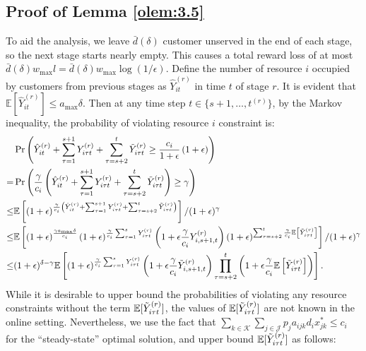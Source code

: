 \documentclass[letterpaper, 10 pt, conference]{ieeeconf}  %
\makeatletter
\renewenvironment{proof}[1][\relax]{\par
  \pushQED{\qed}%
  \normalfont \topsep6\p@\@plus6\p@\relax
  \trivlist
  \item[\hskip\labelsep\itshape
    \ifx#1\relax \proofname\else\proofname{} of #1\fi\@addpunct{.}]\ignorespaces
}{%
  \popQED\endtrivlist\@endpefalse
}
\newcommand{\JJJ}{\mathcal{J}}
\newcommand{\KKK}{\mathcal{K}}
\theoremstyle{plain}
\theoremstyle{definition}
\theoremstyle{remark}
\makeatother
\begin{document}
\subsection{Proof of Lemma \ref{olem:3.5}}
\begin{proof}
To aid the analysis, we leave $\bar{d}(\delta)$ customer unserved in the end of each stage, so the next stage starts nearly empty. This causes a total reward loss of at most $\bar{d}(\delta) w_{\max} l = \bar{d}(\delta) w_{\max} \log (1/\epsilon)$. Define the number of resource $i$ occupied by customers from previous stages as $\hat{Y}^{(r)}_{it}$ in time $t$ of stage $r$. It is evident that $\mathbb{E}[\hat{Y}^{(r)}_{it}] \leq a_{\max} \delta$. Then at any time step $t \in \{s+1,\ldots,t^{(r)}\}$, by the Markov inequality, the probability of violating resource $i$ constraint is:
\begin{align}
&\Pr\left(\hat{Y}^{(r)}_{it}+ \sum^{s+1}_{\tau=1} Y^{(r)}_{i \tau t}+ \sum^{t}_{\tau=s+2} \Tilde{Y}^{(r)}_{i \tau t} \geq \frac{c_i}{1+\epsilon}\left(1+\epsilon\right)\right) \nonumber \\
= & \Pr\left(\frac{\gamma}{c_i} \left(\hat{Y}^{(r)}_{it}+ \sum^{s+1}_{\tau=1} Y^{(r)}_{i \tau t}+ \sum^{t}_{\tau=s+2} \Tilde{Y}^{(r)}_{i \tau t}\right) \geq \gamma \right) \nonumber \\
\leq & \mathbb{E}\left[(1+\epsilon)^{\frac{\gamma}{c_i} \left(\hat{Y}^{(r)}_{it}+ \sum^{s+1}_{\tau=1} Y^{(r)}_{i \tau t}+ \sum^{t}_{\tau=s+2} \Tilde{Y}^{(r)}_{i \tau t}\right)} \right] / (1+\epsilon)^{\gamma} \nonumber \\
\leq & \mathbb{E}\left[(1+\epsilon)^{\frac{\gamma a_{\max} \delta}{c_i}} \left(1+\epsilon\right)^{\frac{\gamma}{c_i} \sum^{s}_{\tau=1} Y^{(r)}_{i \tau t}} \left(1+\epsilon \frac{\gamma}{c_i} Y^{(r)}_{i,s+1,t}\right)\left(1+\epsilon\right)^{\sum^{t}_{\tau=s+2} \frac{\gamma}{c_i}  \mathbb{E}\left[\Tilde{Y}^{(r)}_{i \tau t}\right]}\right] / (1+\epsilon)^{\gamma} \nonumber \\
\leq &  (1+\epsilon)^{\delta - \gamma} \mathbb{E}\left[\left(1+\epsilon\right)^{\frac{\gamma}{c_i} \sum^{s}_{\tau=1} Y^{(r)}_{i \tau t}} \left(1+\epsilon \frac{\gamma}{c_i} \Tilde{Y}^{(r)}_{i,s+1,t}\right) \prod^{t}_{\tau=s+2} \left(1+\epsilon \frac{\gamma}{c_i}  \mathbb{E}\left[\Tilde{Y}^{(r)}_{i \tau t}\right]\right)\right].  \label{oeq:res_vio}
\end{align}
While it is desirable to upper bound the probabilities of violating any resource constraints without the term $\mathbb{E}[\Tilde{Y}^{(r)}_{i \tau t}]$, the values of $\mathbb{E}[\Tilde{Y}^{(r)}_{i \tau t}]$ are not known in the online setting. Nevertheless, we use the fact that $\sum_{k \in \KKK} \sum_{j \in \JJJ} p_j a_{ijk} d_i x^*_{jk} \leq c_i$ for the ``steady-state'' optimal solution, and upper bound $\mathbb{E}[\Tilde{Y}^{(r)}_{i \tau t}]$ as follows:

\end{proof}
\end{document}
